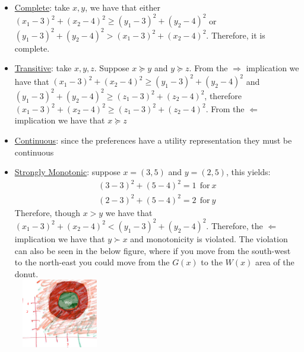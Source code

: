 \documentclass{article}
\begin{document}
\begin{itemize}
    \begin{itemize}
      \item  \underline{Complete}: take $x,y$, we have that either $(x_{1} - 3)^{2} + (x_{2} - 4)^{2} \geq (y_{1} - 3)^{2} + (y_{2}-4)^{2}$ or $(y_{1} - 3)^{2} + (y_{2}-4)^{2} > (x_{1} - 3)^{2} + (x_{2} - 4)^{2}$. Therefore, it is complete.
      \item  \underline{Transitive}: take $x,y,z$. Suppose $x \succeq y$ and $y \succeq z$. From the $\Rightarrow$ implication we have that $(x_{1} - 3)^{2} + (x_{2} - 4)^{2} \geq (y_{1} - 3)^{2} + (y_{2}-4)^{2}$ and $(y_{1} - 3)^{2} + (y_{2}-4)^{2} \geq (z_{1} - 3)^{2} + (z_{2} - 4)^{2}$, therefore $(x_{1} - 3)^{2} + (x_{2}-4)^{2} \geq (z_{1} - 3)^{2} + (z_{2} - 4)^{2}$. From the $\Leftarrow$ implication we have that $x \succeq z$
      \item  \underline{Continuous}: since the preferences have a utility representation they must be continuous
      \item  \underline{Strongly Monotonic}: suppose $x=(3,5)$ and $y=(2,5)$, this yields:
      \begin{gather*}
        (3-3)^{2} + (5-4)^{2} = 1 \ \ \text{for} \ x \\
        (2-3)^{2} + (5-4)^{2} = 2 \ \ \text{for} \ y
      \end{gather*}
      Therefore, though $x > y$ we have that $(x_{1}-3)^{2} + (x_{2}-4)^{2} < (y_{1}-3)^{2} + (y_{2}-4)^{2}$. Therefore, the $\Leftarrow$ implication we have that $y \succ x$ and monotonicity is violated. The violation can also be seen in the below figure, where if you move from the south-west to the north-east you could move from the $G(x)$ to the $W(x)$ area of the donut. \\
      \includegraphics[width=4cm, height=3cm]{pic21}
    \end{itemize}
  \end{itemize}
  \par
\vspace{6mm}
\end{document}
